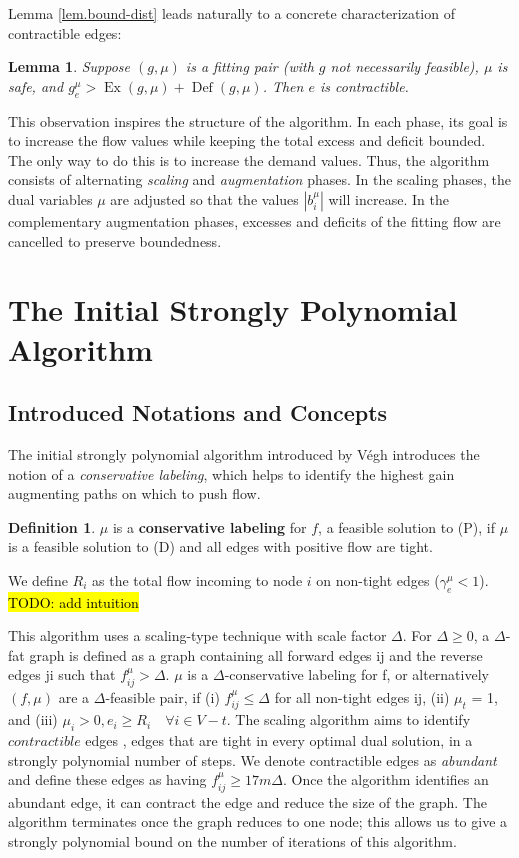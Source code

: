 \documentclass[11pt]{article}
\newtheorem{lemma}[theorem]{Lemma}
\theoremstyle{definition}
\newtheorem{definition}{Definition}[section]
\theoremstyle{definition}
\newcommand{\biu}{b_{i}^{\mu}}
\newcommand{\geu}{\gamma_e^{\mu}}
\DeclareMathOperator{\Ex}{Ex}
\DeclareMathOperator{\Def}{Def}
\newcommand{\todo}[1]{\hl{TODO: #1}}
\begin{document}
    Lemma \ref{lem.bound-dist} leads naturally to a concrete characterization of contractible edges:
    \begin{lemma} \label{lem.contractibility}
    Suppose $(g, \mu)$ is a fitting pair (with $g$ not necessarily feasible),
    $\mu$ is safe, and $g^\mu_e > \Ex(g, \mu) + \Def(g, \mu)$.
    Then $e$ is contractible.
    \end{lemma}
    
    This observation inspires the structure of the algorithm. In each phase, its
    goal is to increase the flow values while keeping the total excess and deficit
    bounded. The only way to do this is to increase the demand values. Thus, the algorithm
    consists of alternating \emph{scaling} and \emph{augmentation} phases. In the scaling phases, the
    dual variables $\mu$ are adjusted so that the values $|\biu|$ will increase. In the
    complementary augmentation phases, excesses and deficits of the fitting flow are
    cancelled to preserve boundedness.
	

\section{The Initial Strongly Polynomial Algorithm}
	\subsection{Introduced Notations and Concepts}
	The initial strongly polynomial algorithm introduced by Végh \cite{Vegh2013}
	introduces the notion of a \textit{conservative labeling}, which helps to
	identify the highest gain augmenting paths on which to push flow.
	\begin{definition}
	$\mu$ is a \textbf{conservative labeling} for $f$, a feasible solution to (P), if $\mu$ is
	a feasible solution to (D) and all edges with positive flow are tight.
	\end{definition}
	We define $R_i$ as the total flow incoming to node $i$ on non-tight edges
	($\geu < 1$). \todo{add intuition}
	
	This algorithm uses a scaling-type technique with scale factor $\Delta$.
	For $\Delta \geq 0$, a $\Delta$-fat graph is defined as a graph containing all
	forward edges ij and the reverse edges ji such that $f_{ij}^\mu > \Delta$. $\mu$
	is a $\Delta$-conservative labeling for f, or alternatively $(f, \mu)$ are a
	$\Delta$-feasible pair, if (i) $f_{ij}^\mu \leq \Delta$ for all non-tight edges ij,
	(ii) $\mu_t$ = 1, and (iii) $\mu_i > 0, e_i \geq R_i \quad \forall i \in V -t$.
	The scaling algorithm aims to identify $\textit{contractible}$ edges \cite{Orlin1988},
	edges that are tight in every optimal dual solution, in a strongly polynomial number of steps.
	We denote contractible edges as \emph{abundant} and define these edges as having
	$f_{ij}^\mu \geq 17m\Delta$. Once the algorithm identifies an abundant edge,
	it can contract the edge and reduce the size of the graph. The algorithm
	terminates once the graph reduces to one node; this allows us to give a
	strongly polynomial bound on the number of iterations of this algorithm.
\end{document}
